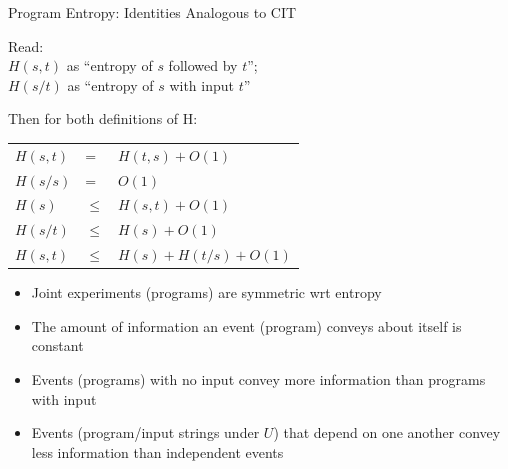 \documentclass{beamer}
\begin{document}

\begin{frame}{Program Entropy: Identities Analogous to CIT}

\begin{structure}{Read:}\\
  $H(s, t)$ as ``entropy of $s$ followed by $t$'';\\
  $H(s/t)$ as ``entropy of $s$ with input $t$''
\end{structure}

\medskip

\begin{structure}{Then for both definitions of H:}
 \begin{center}
 \begin{tabular}[t]{lll}
  $H(s, t)$ &=& $H(t, s) + O(1)$\\
  $H(s/s)$ &=& $O(1)$\\
  $H(s)$ &$\le$& $H(s,t) + O(1)$\\
  $H(s/t)$ &$\le$& $H(s) + O(1)$\\
  $H(s, t)$ &$\le$& $H(s) + H(t/s) + O(1)$\\
 \end{tabular}
 \end{center}
\end{structure}

\medskip

\begin{structure}{}
 \begin{itemize}
  \item{Joint experiments
        (programs) are symmetric wrt entropy}
  \item{The amount of information an event (program) conveys
        about itself is constant}
  \item{Events (programs) with no input convey more information than programs
        with input}
  \item{Events (program/input strings under $U$) that depend on one another
        convey less information than independent events}
 \end{itemize}
\end{structure}

\end{frame}
\end{document}
